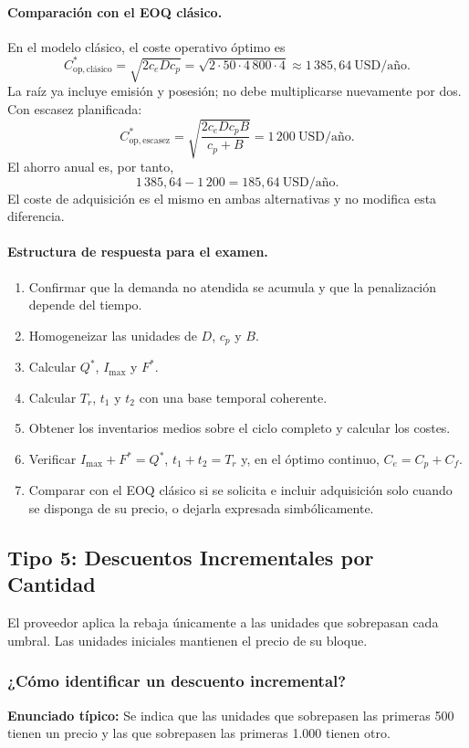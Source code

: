 \documentclass[11pt,a4paper]{article}
\begin{document}
\paragraph{Comparación con el EOQ clásico.}
En el modelo clásico, el coste operativo óptimo es
\[
    C_{\mathrm{op,clásico}}^{*}
    =\sqrt{2c_eDc_p}
    =\sqrt{2\cdot50\cdot4\,800\cdot4}
    \approx1\,385{,}64\ \text{USD/año}.
\]
La raíz ya incluye emisión y posesión; no debe multiplicarse nuevamente por dos. Con escasez planificada:
\[
    C_{\mathrm{op,escasez}}^{*}
    =\sqrt{\frac{2c_eDc_pB}{c_p+B}}
    =1\,200\ \text{USD/año}.
\]
El ahorro anual es, por tanto,
\[
    1\,385{,}64-1\,200
    =\boxed{185{,}64\ \text{USD/año}}.
\]
El coste de adquisición es el mismo en ambas alternativas y no modifica esta diferencia.

\paragraph{Estructura de respuesta para el examen.}
\begin{enumerate}
    \item Confirmar que la demanda no atendida se acumula y que la penalización depende del tiempo.
    \item Homogeneizar las unidades de $D$, $c_p$ y $B$.
    \item Calcular $Q^{*}$, $I_{\max}$ y $F^{*}$.
    \item Calcular $T_r$, $t_1$ y $t_2$ con una base temporal coherente.
    \item Obtener los inventarios medios sobre el ciclo completo y calcular los costes.
    \item Verificar $I_{\max}+F^{*}=Q^{*}$, $t_1+t_2=T_r$ y, en el óptimo continuo, $C_e=C_p+C_f$.
    \item Comparar con el EOQ clásico si se solicita e incluir adquisición solo cuando se disponga de su precio, o dejarla expresada simbólicamente.
\end{enumerate}


\clearpage
\subsection{Tipo 5: Descuentos Incrementales por Cantidad}
El proveedor aplica la rebaja únicamente a las unidades que sobrepasan cada umbral. Las unidades iniciales mantienen el precio de su bloque.

\subsubsection{¿Cómo identificar un descuento incremental?}
\textbf{Enunciado típico:} Se indica que las unidades que sobrepasen las primeras 500 tienen un precio y las que sobrepasen las primeras 1.000 tienen otro.
\end{document}
